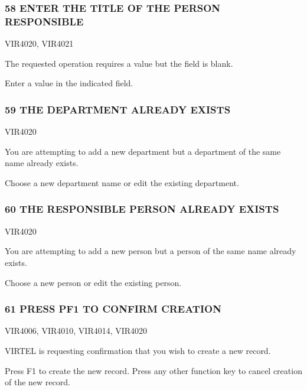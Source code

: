 \documentclass[letterpaper,10pt,english]{sphinxmanual}
\begin{document}
\subsubsection{58 ENTER THE TITLE OF THE PERSON RESPONSIBLE}
\label{\detokenize{messages:enter-the-title-of-the-person-responsible}}\begin{description}
\sphinxAtStartPar
VIR4020, VIR4021

\sphinxAtStartPar
The requested operation requires a value but the field is blank.

\sphinxAtStartPar
Enter a value in the indicated field.

\end{description}


\subsubsection{59 THE DEPARTMENT ALREADY EXISTS}
\label{\detokenize{messages:the-department-already-exists}}\begin{description}
\sphinxAtStartPar
VIR4020

\sphinxAtStartPar
You are attempting to add a new department but a department of the same name already exists.

\sphinxAtStartPar
Choose a new department name or edit the existing department.

\end{description}


\subsubsection{60 THE RESPONSIBLE PERSON ALREADY EXISTS}
\label{\detokenize{messages:the-responsible-person-already-exists}}\begin{description}
\sphinxAtStartPar
VIR4020

\sphinxAtStartPar
You are attempting to add a new person but a person of the same name already exists.

\sphinxAtStartPar
Choose a new person or edit the existing person.

\end{description}


\subsubsection{61 PRESS PF1 TO CONFIRM CREATION}
\label{\detokenize{messages:press-pf1-to-confirm-creation}}\begin{description}
\sphinxAtStartPar
VIR4006, VIR4010, VIR4014, VIR4020

\sphinxAtStartPar
VIRTEL is requesting confirmation that you wish to create a new record.

\sphinxAtStartPar
Press F1 to create the new record. Press any other function key to cancel creation of the new record.

\end{description}
\end{document}
